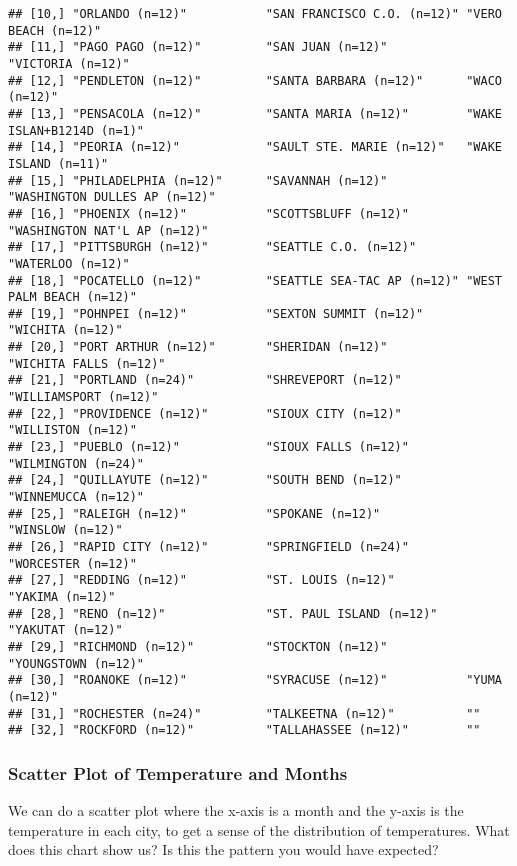 \documentclass[
]{book}
\begin{document}
\begin{verbatim}
## [10,] "ORLANDO (n=12)"           "SAN FRANCISCO C.O. (n=12)" "VERO BEACH (n=12)"          
## [11,] "PAGO PAGO (n=12)"         "SAN JUAN (n=12)"           "VICTORIA (n=12)"            
## [12,] "PENDLETON (n=12)"         "SANTA BARBARA (n=12)"      "WACO (n=12)"                
## [13,] "PENSACOLA (n=12)"         "SANTA MARIA (n=12)"        "WAKE ISLAN+B1214D (n=1)"    
## [14,] "PEORIA (n=12)"            "SAULT STE. MARIE (n=12)"   "WAKE ISLAND (n=11)"         
## [15,] "PHILADELPHIA (n=12)"      "SAVANNAH (n=12)"           "WASHINGTON DULLES AP (n=12)"
## [16,] "PHOENIX (n=12)"           "SCOTTSBLUFF (n=12)"        "WASHINGTON NAT'L AP (n=12)" 
## [17,] "PITTSBURGH (n=12)"        "SEATTLE C.O. (n=12)"       "WATERLOO (n=12)"            
## [18,] "POCATELLO (n=12)"         "SEATTLE SEA-TAC AP (n=12)" "WEST PALM BEACH (n=12)"     
## [19,] "POHNPEI (n=12)"           "SEXTON SUMMIT (n=12)"      "WICHITA (n=12)"             
## [20,] "PORT ARTHUR (n=12)"       "SHERIDAN (n=12)"           "WICHITA FALLS (n=12)"       
## [21,] "PORTLAND (n=24)"          "SHREVEPORT (n=12)"         "WILLIAMSPORT (n=12)"        
## [22,] "PROVIDENCE (n=12)"        "SIOUX CITY (n=12)"         "WILLISTON (n=12)"           
## [23,] "PUEBLO (n=12)"            "SIOUX FALLS (n=12)"        "WILMINGTON (n=24)"          
## [24,] "QUILLAYUTE (n=12)"        "SOUTH BEND (n=12)"         "WINNEMUCCA (n=12)"          
## [25,] "RALEIGH (n=12)"           "SPOKANE (n=12)"            "WINSLOW (n=12)"             
## [26,] "RAPID CITY (n=12)"        "SPRINGFIELD (n=24)"        "WORCESTER (n=12)"           
## [27,] "REDDING (n=12)"           "ST. LOUIS (n=12)"          "YAKIMA (n=12)"              
## [28,] "RENO (n=12)"              "ST. PAUL ISLAND (n=12)"    "YAKUTAT (n=12)"             
## [29,] "RICHMOND (n=12)"          "STOCKTON (n=12)"           "YOUNGSTOWN (n=12)"          
## [30,] "ROANOKE (n=12)"           "SYRACUSE (n=12)"           "YUMA (n=12)"                
## [31,] "ROCHESTER (n=24)"         "TALKEETNA (n=12)"          ""                           
## [32,] "ROCKFORD (n=12)"          "TALLAHASSEE (n=12)"        ""
\end{verbatim}

\hypertarget{scatter-plot-of-temperature-and-months}{%
\subsubsection{Scatter Plot of Temperature and Months}\label{scatter-plot-of-temperature-and-months}}

We can do a scatter plot where the x-axis is a month and the y-axis is the temperature in each city, to get a sense of the distribution of temperatures. What does this chart show us? Is this the pattern you would have expected?
\end{document}
